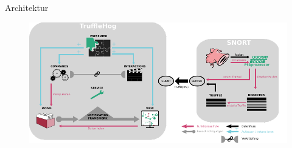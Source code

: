 \begin{frame}{Architektur}
    \begin{figure}
    	\centering
    	\includegraphics[width=\textwidth]{./images/17.pdf}
    \end{figure}
\end{frame}
